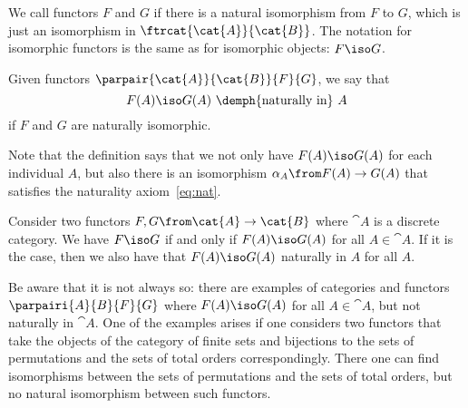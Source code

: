 \begin{defn}
  We call functors $F$ and $G$  if there is a
  natural isomorphism from $F$ to $G$, which is just an isomorphism in
  $\ftrcat{\cat{A}}{\cat{B}}$. The notation for isomorphic functors is the same
  as for isomorphic objects: $F \iso G$.
\end{defn}

\begin{defn}
  Given functors $\parpair{\cat{A}}{\cat{B}}{F}{G}$, we say that
  \[
  F(A) \iso G(A) \text{ \demph{naturally in} } A
  \]
  if $F$ and $G$ are naturally isomorphic.
\end{defn}

Note that the definition says that we not only have $F(A) \iso G(A)$ for each
individual $A$, but also there is an isomorphism $\alpha_A\from F(A) \to G(A)$
that satisfies the naturality axiom~\eqref{eq:nat}.

\begin{exmp}
  Consider two functors $F, G\from \cat{A} \to \cat{B}$ where $\cat{A}$ is a
  discrete category. We have $F \iso G$ if and only if $F(A) \iso G(A)$ for all
  $A \in \cat{A}$. If it is the case, then we also have that $F(A) \iso G(A)$
  naturally in $A$ for all $A$.

  Be aware that it is not always so: there are examples of categories and
  functors $\parpairi{A}{B}{F}{G}$ where $F(A) \iso G(A)$ for all $A \in
  \cat{A}$, but not naturally in $\cat{A}$. One of the examples arises if one
  considers two functors that take the objects of the category of finite sets
  and bijections to the sets of permutations and the sets of total orders
  correspondingly.  There one can find isomorphisms between the sets of
  permutations and the sets of total orders, but no natural isomorphism between
  such functors.
\end{exmp}

